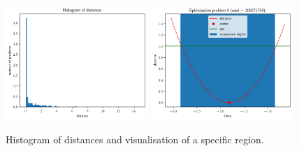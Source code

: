 \begin{figure}[h]
  \begin{center}
    \includegraphics[width=0.48\textwidth]{./latex_files/images/chapter3/example_theta_dist.png}
    \includegraphics[width=0.48\textwidth]{./latex_files/images/chapter3/example_region.png}
    \end{center}
    \caption[Histogram of distances at the 1D example.]{Histogram of
      distances and visualisation of a specific region.}
    \label{fig:example_training_hist}
\end{figure}

